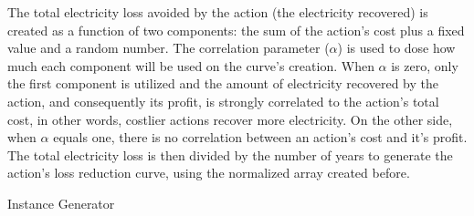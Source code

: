 The total electricity loss avoided by the action (the electricity recovered) is created as a function of two components: the sum of the action's
cost plus a fixed value and a random number. The correlation parameter ($\alpha$) is used to dose how much each component will be used on the curve's 
creation. When $\alpha$ is zero, only the first component is utilized and the amount of electricity recovered by the action, and consequently its profit,
is strongly correlated to the action's total cost, in other words, costlier actions recover more electricity. On the other side, when $\alpha$ equals
one, there is no correlation between an action's cost and it's profit. The total electricity loss is then divided by the number of years to generate the 
action's loss reduction curve, using the normalized array created before.

\begin{spacing}{1.2}
\begin{algorithm}[H]
\caption{Instance Generator}
\label{alg:gen}
\end{algorithm}
\end{spacing}

